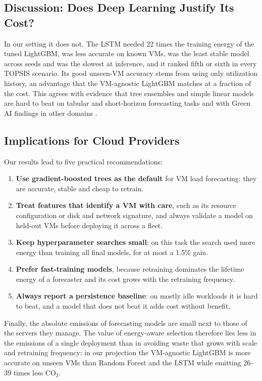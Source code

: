 \documentclass[conference,letterpaper,10pt]{IEEEtran}
\begin{document}
\subsection{Discussion: Does Deep Learning Justify Its Cost?}
In our setting it does not. The LSTM needed 22 times the training energy of the tuned LightGBM, was less accurate on known VMs, was the least stable model across seeds and was the slowest at inference, and it ranked fifth or sixth in every TOPSIS scenario. Its good unseen-VM accuracy stems from using only utilization history, an advantage that the VM-agnostic LightGBM matches at a fraction of the cost. This agrees with evidence that tree ensembles and simple linear models are hard to beat on tabular and short-horizon forecasting tasks \cite{grinsztajn2022tree,zeng2023transformers} and with Green AI findings in other domains \cite{vente2024clicks,barros2025small}.

\subsection{Implications for Cloud Providers}
Our results lead to five practical recommendations:
\begin{enumerate}
  \item \textbf{Use gradient-boosted trees as the default} for VM load forecasting: they are accurate, stable and cheap to retrain.
  \item \textbf{Treat features that identify a VM with care}, such as its resource configuration or disk and network signature, and always validate a model on held-out VMs before deploying it across a fleet.
  \item \textbf{Keep hyperparameter searches small}: on this task the search used more energy than training all final models, for at most a 1.5\% gain.
  \item \textbf{Prefer fast-training models}, because retraining dominates the lifetime energy of a forecaster and its cost grows with the retraining frequency.
  \item \textbf{Always report a persistence baseline}: on mostly idle workloads it is hard to beat, and a model that does not beat it adds cost without benefit.
\end{enumerate}

Finally, the absolute emissions of forecasting models are small next to those of the servers they manage. The value of energy-aware selection therefore lies less in the emissions of a single deployment than in avoiding waste that grows with scale and retraining frequency: in our projection the VM-agnostic LightGBM is more accurate on unseen VMs than Random Forest and the LSTM while emitting 26--39 times less CO$_2$.
\end{document}
